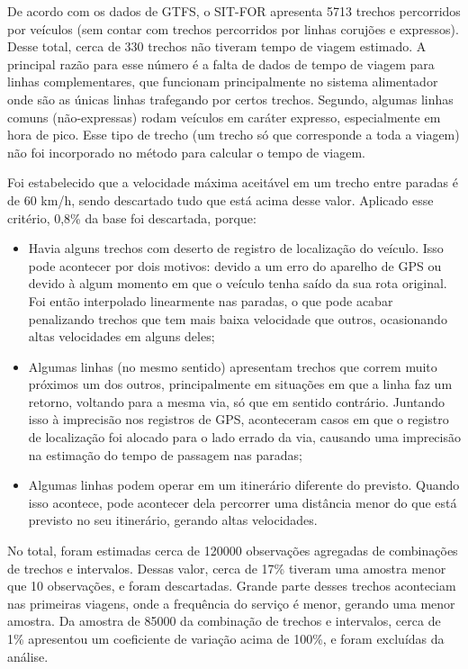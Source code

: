 \documentclass[        
    a4paper,          %
    12pt,             %
    chapter=TITLE,    %
    section=Title,    %
    subsection=Title, %
    oneside,          %
    english,          %
    spanish,          %
    brazil,           %
    fleqn             %
]{abntex2}
\begin{document}
  De acordo com os dados de GTFS, o SIT-FOR apresenta 5713 trechos percorridos por veículos (sem contar com trechos percorridos por linhas corujões e expressos). Desse total, cerca de 330 trechos não tiveram tempo de viagem estimado. A principal razão para esse número é a falta de dados de tempo de viagem para linhas complementares, que funcionam principalmente no sistema alimentador onde são as únicas linhas trafegando por certos trechos. Segundo, algumas linhas comuns (não-expressas) rodam veículos em caráter expresso, especialmente em hora de pico. Esse tipo de trecho (um trecho só que corresponde a toda a viagem) não foi incorporado no método para calcular o tempo de viagem.
  
  Foi estabelecido que a velocidade máxima aceitável em um trecho entre paradas é de 60 km/h, sendo descartado tudo que está acima desse valor. Aplicado esse critério, 0,8\% da base foi descartada, porque:
  
  \begin{itemize}
  \tightlist
  \item
    Havia alguns trechos com deserto de registro de localização do veículo. Isso pode acontecer por dois motivos: devido a um erro do aparelho de GPS ou devido à algum momento em que o veículo tenha saído da sua rota original. Foi então interpolado linearmente nas paradas, o que pode acabar penalizando trechos que tem mais baixa velocidade que outros, ocasionando altas velocidades em alguns deles;
  \item
    Algumas linhas (no mesmo sentido) apresentam trechos que correm muito próximos um dos outros, principalmente em situações em que a linha faz um retorno, voltando para a mesma via, só que em sentido contrário. Juntando isso à imprecisão nos registros de GPS, aconteceram casos em que o registro de localização foi alocado para o lado errado da via, causando uma imprecisão na estimação do tempo de passagem nas paradas;
  \item
    Algumas linhas podem operar em um itinerário diferente do previsto. Quando isso acontece, pode acontecer dela percorrer uma distância menor do que está previsto no seu itinerário, gerando altas velocidades.
  \end{itemize}
  
  No total, foram estimadas cerca de 120000 observações agregadas de combinações de trechos e intervalos. Dessas valor, cerca de 17\% tiveram uma amostra menor que 10 observações, e foram descartadas. Grande parte desses trechos aconteciam nas primeiras viagens, onde a frequência do serviço é menor, gerando uma menor amostra. Da amostra de 85000 da combinação de trechos e intervalos, cerca de 1\% apresentou um coeficiente de variação acima de 100\%, e foram excluídas da análise.
  
\end{document}
